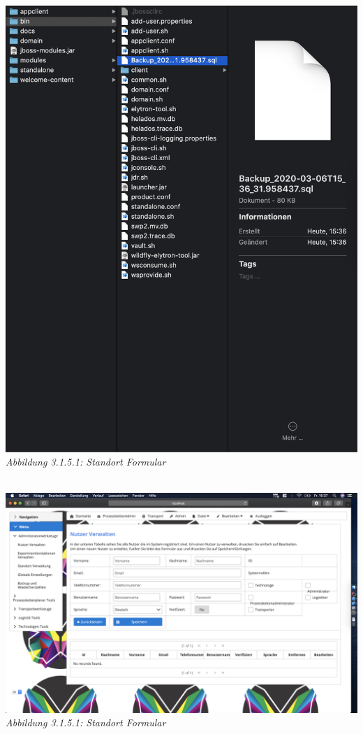 \documentclass[enabledeprecatedfontcommands,fontsize=12pt,paper=a4,twoside]{scrartcl}
\begin{document}
\hypertarget{sc3.1.5.1}{
\includegraphics[width=1\textwidth]{Screenshots/5BackUpDatei.png}
\textit{Abbildung 3.1.5.1: Standort Formular}
} \\

\hypertarget{sc3.1.5.1}{
\includegraphics[width=1\textwidth]{Screenshots/5NotUsers.png}
\textit{Abbildung 3.1.5.1: Standort Formular}
} \\
\end{document}
